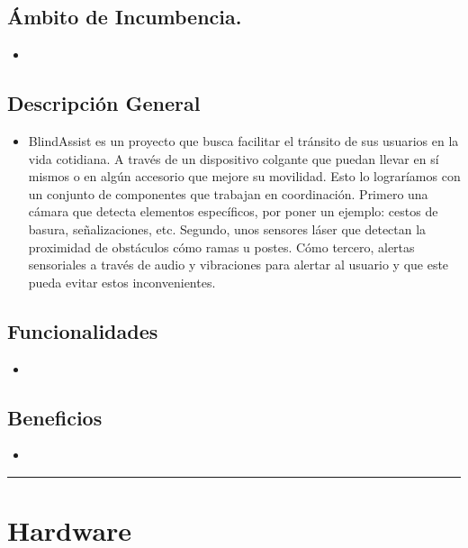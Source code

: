 \documentclass[12pt,a4paper]{article}
\newcommand{\separador}{\vspace{0.5cm}\noindent\rule{\linewidth}{0.5pt}\vspace{0.5cm}}
\begin{document}
\subsection{Ámbito de Incumbencia.}

\begin{itemize}
    \item 
\end{itemize}

\subsection{Descripción General}

\begin{itemize}

    \item BlindAssist es un proyecto que busca facilitar el tránsito de sus usuarios en la vida cotidiana. A través de un dispositivo colgante que puedan llevar en sí mismos o en algún accesorio que mejore su movilidad. Esto lo lograríamos con un conjunto de componentes que trabajan en coordinación. Primero una cámara que detecta elementos específicos, por poner un ejemplo: cestos de basura, señalizaciones, etc. Segundo, unos sensores láser que detectan la proximidad de obstáculos cómo ramas u postes. Cómo tercero, alertas sensoriales a través de audio y vibraciones para alertar al usuario y que este pueda evitar estos inconvenientes. 
    
\end{itemize}

\subsection{Funcionalidades}
\begin{itemize}
    \item 
\end{itemize}

\subsection{Beneficios}
\begin{itemize}
    \item 
\end{itemize}

\separador

\section{Hardware}
\end{document}

